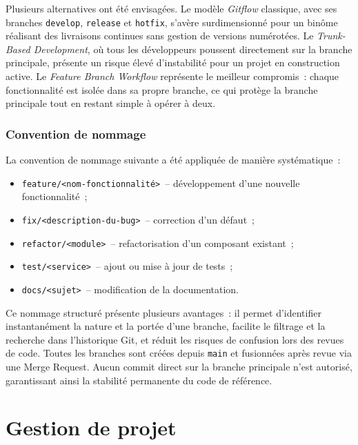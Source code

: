 Plusieurs alternatives ont été envisagées. Le modèle \textit{Gitflow} classique, avec ses branches
\texttt{develop}, \texttt{release} et \texttt{hotfix}, s'avère surdimensionné pour un binôme
réalisant des livraisons continues sans gestion de versions numérotées. Le \textit{Trunk-Based
Development}, où tous les développeurs poussent directement sur la branche principale, présente un
risque élevé d'instabilité pour un projet en construction active. Le \textit{Feature Branch
Workflow} représente le meilleur compromis~: chaque fonctionnalité est isolée dans sa propre
branche, ce qui protège la branche principale tout en restant simple à opérer à deux.

\subsubsection*{Convention de nommage}

La convention de nommage suivante a été appliquée de manière systématique~:

\begin{itemize}
    \item \texttt{feature/<nom-fonctionnalité>}~-- développement d'une nouvelle fonctionnalité~;
    \item \texttt{fix/<description-du-bug>}~-- correction d'un défaut~;
    \item \texttt{refactor/<module>}~-- refactorisation d'un composant existant~;
    \item \texttt{test/<service>}~-- ajout ou mise à jour de tests~;
    \item \texttt{docs/<sujet>}~-- modification de la documentation.
\end{itemize}

Ce nommage structuré présente plusieurs avantages~: il permet d'identifier instantanément la
nature et la portée d'une branche, facilite le filtrage et la recherche dans l'historique Git,
et réduit les risques de confusion lors des revues de code. Toutes les branches sont créées
depuis \texttt{main} et fusionnées après revue via une Merge Request. Aucun commit direct sur
la branche principale n'est autorisé, garantissant ainsi la stabilité permanente du code de
référence.

\section{Gestion de projet}

